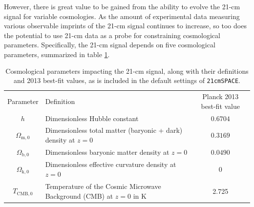 \documentclass[floats,floatfix,showpacs,amssymb,prd,superscriptaddress,nofootinbib]{revtex4-2} %
\newcommand{\code}{\texttt}
\begin{document}
However, there is great value to be gained from the ability to evolve the 21-cm signal for variable cosmologies. As the amount of experimental data measuring various observable imprints of the 21-cm signal continues to increase, so too does the potential to use 21-cm data as a probe for constraining cosmological parameters. Specifically, the 21-cm signal depends on five cosmological parameters, summarized in table \ref{tab:cosmological_parameters}.


\begin{table}[H]
    \centering
    \begin{tabular}{c l c}
        \hline
        Parameter & Definition & Planck 2013 best-fit value\\ \hhline{===}
        $h$ & Dimensionless Hubble constant & $0.6704$\\
        $\Omega_{\text{m}, 0}$ & Dimensionless total matter (baryonic + dark) density at $z = 0$ & $0.3169$\\
        $\Omega_{\text{b}, 0}$ & Dimensionless baryonic matter density at $z = 0$ & $0.0490$\\
        $\Omega_{\text{k}, 0}$ & Dimensionless effective curvature density at $z = 0$ & $0$\\
        $T_{\text{CMB},0}$ & Temperature of the Cosmic Microwave Background (CMB) at $z = 0$ in K & 2.725\\ \hline
    \end{tabular}
    \caption{Cosmological parameters impacting the 21-cm signal, along with their definitions and 2013 best-fit values, as is included in the default settings of \code{21cmSPACE}.}
    \label{tab:cosmological_parameters}
\end{table}


\end{document}
